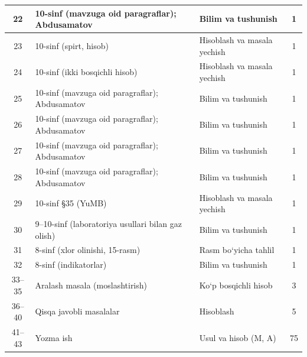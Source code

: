 \documentclass[11pt,a4paper]{article}
\begin{document}
{\begin{longtable}{|c|p{7.2cm}|p{5.4cm}|c|}
22 & 10-sinf (mavzuga oid paragraflar); Abdusamatov & Bilim va tushunish & 1\\\hline
23 & 10-sinf (spirt, hisob) & Hisoblash va masala yechish & 1\\\hline
24 & 10-sinf (ikki bosqichli hisob) & Hisoblash va masala yechish & 1\\\hline
25 & 10-sinf (mavzuga oid paragraflar); Abdusamatov & Bilim va tushunish & 1\\\hline
26 & 10-sinf (mavzuga oid paragraflar); Abdusamatov & Bilim va tushunish & 1\\\hline
27 & 10-sinf (mavzuga oid paragraflar); Abdusamatov & Bilim va tushunish & 1\\\hline
28 & 10-sinf (mavzuga oid paragraflar); Abdusamatov & Bilim va tushunish & 1\\\hline
29 & 10-sinf \S{}35 (YuMB) & Hisoblash va masala yechish & 1\\\hline
30 & 9--10-sinf (laboratoriya usullari bilan gaz olish) & Bilim va tushunish & 1\\\hline
31 & 8-sinf (xlor olinishi, 15-rasm) & Rasm bo`yicha tahlil & 1\\\hline
32 & 8-sinf (indikatorlar) & Bilim va tushunish & 1\\\hline
33--35 & Aralash masala (moslashtirish) & Ko`p bosqichli hisob & 3\\\hline
36--40 & Qisqa javobli masalalar & Hisoblash & 5\\\hline
41--43 & Yozma ish & Usul va hisob (M, A) & 75\\\hline
\end{longtable}}
\end{document}
